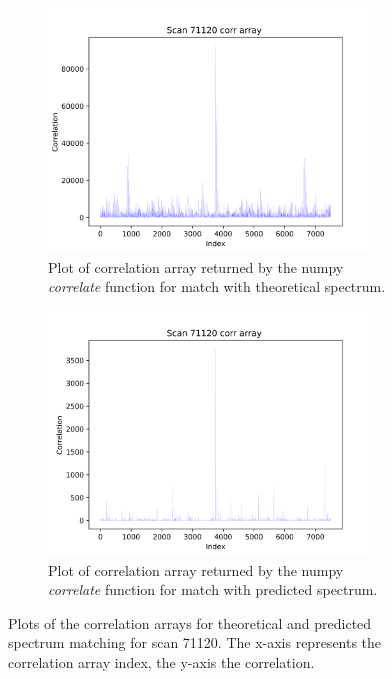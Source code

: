 \documentclass[11pt]{article}
\begin{document}
\begin{figure}
\centering
\begin{subfigure}[b]{1\textwidth}
\centering
    \includegraphics[width=0.95\textwidth]{figs/corrtheo.png}
   \caption{Plot of correlation array returned by the numpy \textit{correlate} function for match with theoretical spectrum.}
   \label{fig:corrtheo} 
\end{subfigure}
\begin{subfigure}[b]{1\textwidth}
\centering
   \includegraphics[width=0.95\textwidth]{figs/corrpredict.png}
   \caption{Plot of correlation array returned by the numpy \textit{correlate} function for match with predicted spectrum.}
   \label{fig:corrpredict}
\end{subfigure}
\caption{Plots of the correlation arrays for theoretical and predicted spectrum matching for scan 71120. The x-axis represents the correlation array index, the y-axis the correlation.}
\label{predandtheocorr}
\end{figure}
\end{document}
